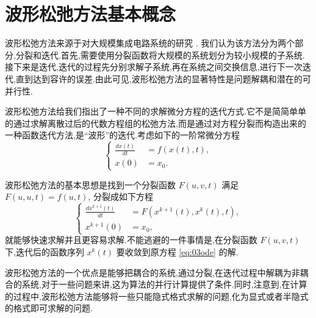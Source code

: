 \section{波形松弛方法基本概念}\label{sec:03wrintro}

波形松弛方法来源于对大规模集成电路系统的研究 \cite{lelarasmee1982waveform}. 我们认为该方法分为两个部分,分裂和迭代.首先,需要使用分裂函数将大规模的系统划分为较小规模的子系统.接下来是迭代,迭代的过程先分别求解子系统,再在系统之间交换信息,进行下一次迭代,直到达到容许的误差.由此可见,波形松弛方法的显著特性是问题解耦和潜在的可并行性.

波形松弛方法给我们指出了一种不同的求解微分方程的迭代方式.它不是简简单单的通过求解离散过后的代数方程组的松弛方法,而是通过对方程分裂而构造出来的一种函数迭代方法,是``波形''的迭代.考虑如下的一阶常微分方程
\begin{equation}\label{eq:03ode}
\left\{
\begin{aligned}
\frac{dx(t)}{dt}&=f(x(t),t),\\
x(0)&=x_{0}.
\end{aligned}
\right.
\end{equation}

波形松弛方法的基本思想是找到一个分裂函数 $F(u,v,t)$ 满足 $F(u,u,t)=f(u,t)$, 分裂成如下方程
\begin{equation*}
\left\{
\begin{aligned}
\frac{dx^{k+1}(t)}{dt}&=F(x^{k+1}(t),x^{k}(t),t),\\
x^{k+1}(0)&=x_{0},
\end{aligned}
\right.
\end{equation*}
就能够快速求解并且更容易求解.不能逃避的一件事情是,在分裂函数 $F(u,v,t)$ 下,迭代后的函数序列 $x^{k}(t)$ 要收敛到原方程 \eqref{eq:03ode} 的解.

波形松弛方法的一个优点是能够把耦合的系统,通过分裂,在迭代过程中解耦为非耦合的系统,对于一些问题来讲,这为算法的并行计算提供了条件.同时,注意到,在计算的过程中,波形松弛方法能够将一些只能隐式格式求解的问题,化为显式或者半隐式的格式即可求解的问题.


